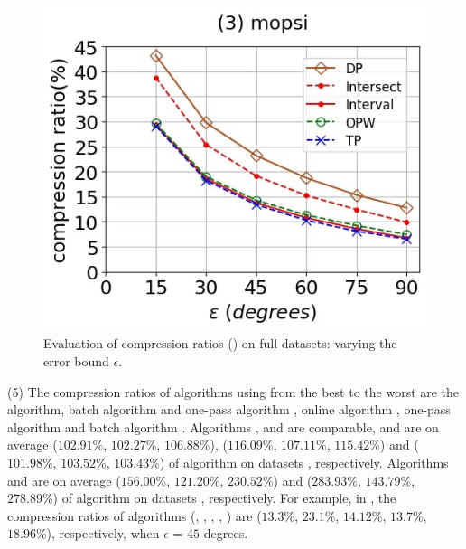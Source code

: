 \begin{figure}[tb!]
	\includegraphics[scale=0.250]{Figures/Exp-DAD-CR-epsilon-mopsi.jpg}		
	\vspace{-2ex}
	\caption{\small Evaluation of compression ratios (\dad) on full datasets: varying the error bound $\epsilon$.}
	\label{fig:cr-dad-epsilon}
	\vspace{-2ex}
\end{figure}




\sstab(5) The compression ratios of algorithms using \dad from the best
to the worst are the \opt algorithm, batch algorithm \tpa and
one-pass algorithm \interval, online algorithm \opwa, one-pass algorithm \intersec and batch algorithm \dpa.
%
{Algorithms \tpa, \opwa and \interval are comparable, and are on average
($102.91\%$, $102.27\%$, $106.88\%$), ($116.09\%$, $107.11\%$, $115.42\%$) and ($101.98\%$, $103.52\%$, $103.43\%$)
 of algorithm \opt on datasets \dSets, respectively.}
%
{Algorithms \intersec and \dpa are on average ($156.00\%$, $121.20\%$, $230.52\%$) and ($283.93\%$, $143.79\%$, $278.89\%$)
 of algorithm \opt on datasets \dSets, respectively.}
%
For example, in \mopsi, the compression ratios of algorithms (\tpa, \dpa, \opwa, \interval, \intersec)
are ($13.3\%$, $23.1\%$, $14.12\%$, $13.7\%$, $18.96\%$), respectively, when $\epsilon$ = $45$ degrees.
%


